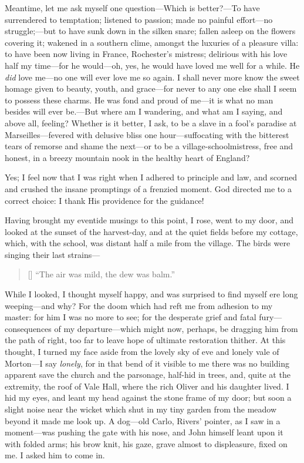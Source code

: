 Meantime, let me ask myself one question---Which is better?---To have
surrendered to temptation; listened to passion; made no painful
effort---no struggle;---but to have sunk down in the silken snare;
fallen asleep on the flowers covering it; wakened in a southern clime,
amongst the luxuries of a pleasure villa: to have been now living in
France, \Mr{} Rochester's mistress; delirious with his love half my
time---for he would---oh, yes, he would have loved me well for a while.
He \emph{did} love me---no one will ever love me so again. I shall
never more know the sweet homage given to beauty, youth, and grace---for
never to any one else shall I seem to possess these charms. He was fond
and proud of me---it is what no man besides will ever be.---But where am
I wandering, and what am I saying, and above all, feeling? Whether is
it better, I ask, to be a slave in a fool's paradise at
Marseilles---fevered with delusive bliss one hour---suffocating with the
bitterest tears of remorse and shame the next---or to be a
village-schoolmistress, free and honest, in a breezy mountain nook in
the healthy heart of England?

Yes; I feel now that I was right when I adhered to principle and law,
and scorned and crushed the insane promptings of a frenzied moment. God
directed me to a correct choice: I thank His providence for the
guidance!

Having brought my eventide musings to this point, I rose, went to my
door, and looked at the sunset of the harvest-day, and at the quiet
fields before my cottage, which, with the school, was distant half a
mile from the village. The birds were singing their last strains---

\begin{verse}[\versewidth]
	\enquote{The air was mild, the dew was balm.}
\end{verse}

While I looked, I thought myself happy, and was surprised to find myself
ere long weeping---and why? For the doom which had reft me from
adhesion to my master: for him I was no more to see; for the desperate
grief and fatal fury---consequences of my departure---which might now,
perhaps, be dragging him from the path of right, too far to leave hope
of ultimate restoration thither. At this thought, I turned my face
aside from the lovely sky of eve and lonely vale of Morton---I say
\emph{lonely}, for in that bend of it visible to me there was no
building apparent save the church and the parsonage, half-hid in trees,
and, quite at the extremity, the roof of Vale Hall, where the rich \Mr{}
Oliver and his daughter lived. I hid my eyes, and leant my head against
the stone frame of my door; but soon a slight noise near the wicket
which shut in my tiny garden from the meadow beyond it made me look up.
A dog---old Carlo, \Mr{} Rivers' pointer, as I saw in a moment---was
pushing the gate with his nose, and \St{} John himself leant upon it with
folded arms; his brow knit, his gaze, grave almost to displeasure, fixed
on me. I asked him to come in.

